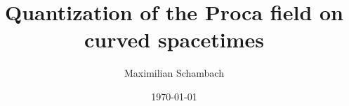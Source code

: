 \usepackage[utf8]{inputenc}
\usepackage[english]{babel}
\usepackage{amsmath}
\usepackage{amsfonts}
\usepackage{amssymb}
\usepackage{graphicx}
\usepackage[left=3.5cm,right=2cm,top=2.5cm,bottom=2.5cm]{geometry}

\usepackage[scr=rsfso, cal=cm]{mathalfa} %



\title{Quantization of the Proca field on curved spacetimes}
\author{Maximilian Schambach}
\date{\today}



\usepackage{titlesec,titletoc}
\usepackage{scrtime}
\usepackage{textcomp}
\usepackage{upgreek}
\usepackage{framed}
\usepackage{tabularx}
\usepackage{xcolor}
\usepackage{cases}

\usepackage{enumitem} %


\usepackage{float} 	%





\usepackage{subfigure}
\usepackage{setspace} %
\usepackage{bbm} 	%
\usepackage[normalem]{ulem}	%
\usepackage{marvosym} %

\usepackage[all]{xy} %
\usepackage{tikz} %
\usepackage{parskip}
\bigskipamount=10pt





\usepackage{mathtools} %

\usepackage{braket}  %

